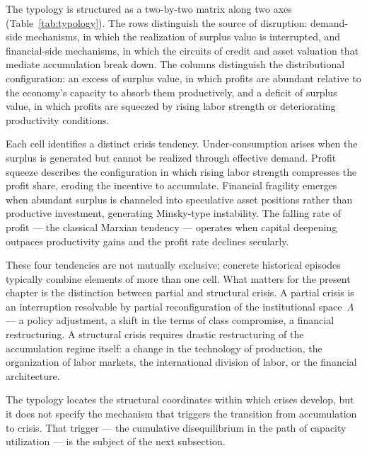 \documentclass[12pt,letterpaper]{article}
\begin{document}
The typology is structured as a two-by-two matrix along two axes
(Table~\ref{tab:typology}). The rows distinguish the source of disruption:
demand-side mechanisms, in which the realization of surplus value is
interrupted, and financial-side mechanisms, in which the circuits of credit and
asset valuation that mediate accumulation break down. The columns distinguish
the distributional configuration: an excess of surplus value, in which profits
are abundant relative to the economy's capacity to absorb them productively,
and a deficit of surplus value, in which profits are squeezed by rising labor
strength or deteriorating productivity conditions.

Each cell identifies a distinct crisis tendency. Under-consumption arises when
the surplus is generated but cannot be realized through effective demand.
Profit squeeze describes the configuration in which rising labor strength
compresses the profit share, eroding the incentive to accumulate. Financial
fragility emerges when abundant surplus is channeled into speculative asset
positions rather than productive investment, generating Minsky-type
instability. The falling rate of profit --- the classical Marxian tendency ---
operates when capital deepening outpaces productivity gains and the profit rate
declines secularly.

These four tendencies are not mutually exclusive; concrete historical episodes
typically combine elements of more than one cell. What matters for the present
chapter is the distinction between partial and structural crisis. A partial
crisis is an interruption resolvable by partial reconfiguration of the
institutional space~$\Lambda$ --- a policy adjustment, a shift in the terms of
class compromise, a financial restructuring. A structural crisis requires
drastic restructuring of the accumulation regime itself: a change in the
technology of production, the organization of labor markets, the international
division of labor, or the financial architecture.

The typology locates the structural coordinates within which crises develop,
but it does not specify the mechanism that triggers the transition from
accumulation to crisis. That trigger --- the cumulative disequilibrium in the
path of capacity utilization --- is the subject of the next subsection.
\end{document}
